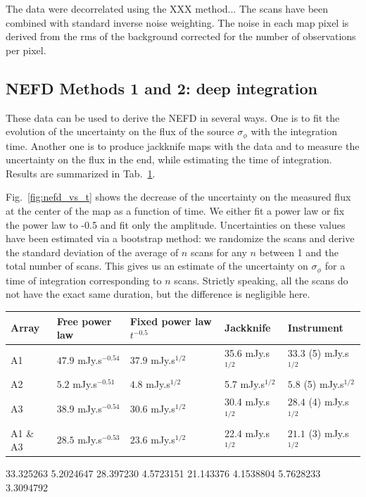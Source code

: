 \documentclass[a4paper, 11pt]{article} %
\begin{document}
The data were decorrelated using the XXX method... The scans have been combined
with standard inverse noise weighting. The noise in each map pixel is derived
from the rms of the background corrected for the number of observations per
pixel.

\subsection{NEFD Methods 1 and 2: deep integration}
These data can be used to derive the NEFD in several ways. One is to fit the
evolution of the uncertainty on the flux of the source $\sigma_\phi$ with the
integration time. Another one is to produce jackknife maps with the data and to
measure the uncertainty on the flux in the end, while estimating the time of
integration. Results are summarized in Tab.~\ref{tab:nefd}.

Fig.~\ref{fig:nefd_vs_t} shows the decrease of the uncertainty on the measured
flux at the center of the map as a function of time. We either fit a power law
or fix the power law to -0.5 and fit only the amplitude. Uncertainties on these
values have been estimated via a bootstrap method: we randomize the scans and
derive the standard deviation of the average of $n$ scans for any $n$ between 1
and the total number of scans. This gives us an estimate of the uncertainty on
$\sigma_\phi$ for a time of integration corresponding to $n$ scans. Strictly
speaking, all the scans do not have the exact same duration, but the difference
is negligible here.


\begin{table}
\begin{tabular}{|l|l|l|l|l|}
\hline
Array & Free power law & Fixed power law $t^{-0.5}$ & Jackknife & Instrument \\
\hline
A1       & $47.9$ mJy.s$^{-0.54}$ & $37.9$ mJy.s$^{1/2}$ & 35.6 mJy.s$^{1/2}$ & $33.3$ (5) mJy.s$^{1/2}$\\
A2       & $5.2$  mJy.s$^{-0.51}$ & $4.8$  mJy.s$^{1/2}$ & 5.7  mJy.s$^{1/2}$ & $5.8$  (5) mJy.s$^{1/2}$\\
A3       & $38.9$ mJy.s$^{-0.54}$ & $30.6$ mJy.s$^{1/2}$ & 30.4 mJy.s$^{1/2}$ & $28.4$ (4) mJy.s$^{1/2}$\\
A1 \& A3 & $28.5$ mJy.s$^{-0.53}$ & $23.6$ mJy.s$^{1/2}$ & 22.4 mJy.s$^{1/2}$ & $21.1$ (3) mJy.s$^{1/2}$\\
\hline
\end{tabular}
\label{tab:nefd}
\end{table}
       33.325263       5.2024647
       28.397230       4.5723151
       21.143376       4.1538804
       5.7628233       3.3094792
\end{document}
